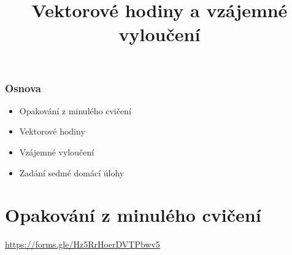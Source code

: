 \documentclass[usenames,dvipsnames,9pt]{beamer}
\title{Vektorové hodiny a vzájemné vyloučení}
\date{}
\institute{B4B36PDV -- Paralelní a distribuované výpočty}
\begin{document}
\maketitle

\begin{frame}
  \frametitle{Osnova}
  \begin{itemize}
    \item Opakování z minulého cvičení\\[1.5em]
    \item Vektorové hodiny
    \item Vzájemné vyloučení\\[1.5em]
    \item Zadání sedmé domácí úlohy
  \end{itemize}
\end{frame}


\section{Opakování z minulého cvičení}

\begin{frame}[standout]
 \vspace{3em}

 \Huge
 \url{https://forms.gle/Hz5RrHoerDVTPbwv5}
\end{frame}
\end{document}
